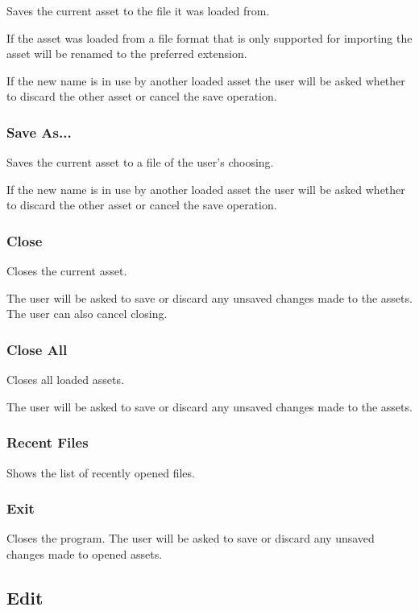 \documentclass[10pt, a4paper, titlepage, oneside]{article}
\begin{document}
Saves the current asset to the file it was loaded from.

If the asset was loaded from a file format that is only supported for importing the asset will be renamed to the preferred extension.

If the new name is in use by another loaded asset the user will be asked whether to discard the other asset or cancel the save operation.

\subsubsection{Save As...}

Saves the current asset to a file of the user's choosing.

If the new name is in use by another loaded asset the user will be asked whether to discard the other asset or cancel the save operation.

\subsubsection{Close}

Closes the current asset.

The user will be asked to save or discard any unsaved changes made to the assets. The user can also cancel closing.

\subsubsection{Close All}

Closes all loaded assets.

The user will be asked to save or discard any unsaved changes made to the assets.

\subsubsection{Recent Files}

Shows the list of recently opened files.

\subsubsection{Exit}

Closes the program. The user will be asked to save or discard any unsaved changes made to opened assets.

\newpage

\subsection{Edit}
\end{document}
